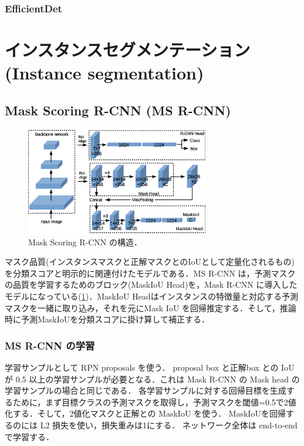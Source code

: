 \documentclass[originalpaper]{jsaiart}     %
\begin{document}
\subsubsection{EfficientDet}
\section{インスタンスセグメンテーション(Instance segmentation)}
\subsection{Mask Scoring R-CNN (MS R-CNN)}
\begin{figure}[tb]
    \begin{center}
        \includegraphics[width=8cm,clip]{fig/archi_ms_rcnn.eps}
    \end{center}
    \caption{ Mask Scoring R-CNN の構造．}
    \label{fig:archi_ms_rcnn}
\end{figure}
マスク品質(インスタンスマスクと正解マスクとのIoUとして定量化されるもの)を分類スコアと明示的に関連付けたモデルである\cite{HHGHW19}．MS R-CNN は，予測マスクの品質を学習するためのブロック(MaskIoU Head)を，Mask R-CNN\cite{HGDG17} に導入したモデルになっている(\ref{fig:archi_ms_rcnn})．MaskIoU Headはインスタンスの特徴量と対応する予測マスクを一緒に取り込み，それを元にMask IoU を回帰推定する．そして，推論時に予測MaskIoUを分類スコアに掛け算して補正する．
\subsubsection{MS R-CNN の学習}
学習サンプルとして RPN proposals を使う．
proposal box と正解box との IoU が 0.5 以上の学習サンプルが必要となる．これは Mask R-CNN の Mask head の学習サンプルの場合と同じである．
各学習サンプルに対する回帰目標を生成するために，まず目標クラスの予測マスクを取得し，予測マスクを閾値=0.5で2値化する．そして，2値化マスクと正解との MaskIoU を使う．
MaskIoUを回帰するのには L2 損失を使い，損失重みは1にする．
ネットワーク全体は end-to-end で学習する．
\end{document}
